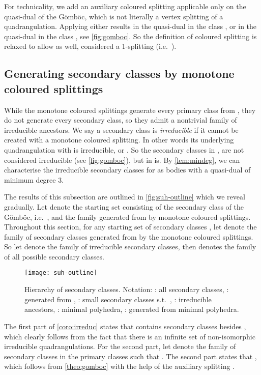 \documentclass[]{article}
\newcommand{\suh}{\xspace}
\newcommand{\col}{\xspace}
\newcommand{\Gomboc}{Gömböc\xspace}
\begin{document}
For technicality, we add an auxiliary coloured splitting  applicable only on the quasi-dual  of the \Gomboc, which is not literally a vertex splitting of a quadrangulation.
Applying  either results in the quasi-dual in the class , or in the quasi-dual in the class , see \autoref{fig:gomboc}.
So the definition of coloured splitting is relaxed to allow  as well, considered a 1-splitting (i.e.\  ).


\subsection{Generating secondary classes by monotone coloured splittings}

While the monotone coloured splittings generate every primary class from , they do not generate every secondary class, so they admit a nontrivial family of irreducible ancestors.
We say a secondary class is \emph{irreducible} if it cannot be created with a monotone coloured splitting.
In other words its underlying quadrangulation with  is irreducible, or .
So the secondary classes in ,  are not considered irreducible (see \autoref{fig:gomboc}), but  in  is.
By \autoref{lem:mindeg}, we can characterise the irreducible secondary classes for  as bodies with a quasi-dual of minimum degree 3.

The results of this subsection are outlined in \autoref{fig:suh-outline} which we reveal gradually. Let  denote the starting set consisting of the secondary class of the \Gomboc, i.e.\  , and \col the family generated from  by monotone coloured splittings.
Throughout this section, for any starting set of secondary classes , let  denote the family of secondary classes generated from  by the monotone coloured splittings.
So let  denote the family of irreducible secondary classes, then \suh denotes the family of all possible secondary classes.

\begin{figure}
  \centering
  \texttt{[image: suh-outline]}
  \caption{Hierarchy of secondary classes.
    Notation: \suh: all secondary classes,
    \col: generated from ,
    : small secondary classes s.t.~,
    : irreducible ancestors,
    : minimal polyhedra,
    : generated from minimal polyhedra.}
\label{fig:suh-outline}
\end{figure}

The first part of \autoref{coro:irreduc} states that  contains secondary classes besides , which clearly follows from the fact that there is an infinite set of non-isomorphic irreducible quadrangulations.
For the second part, let  denote the family of secondary classes in the primary classes  such that .
The second part states that , which follows from \autoref{theo:gomboc} with the help of the auxiliary splitting . 
\end{document}
